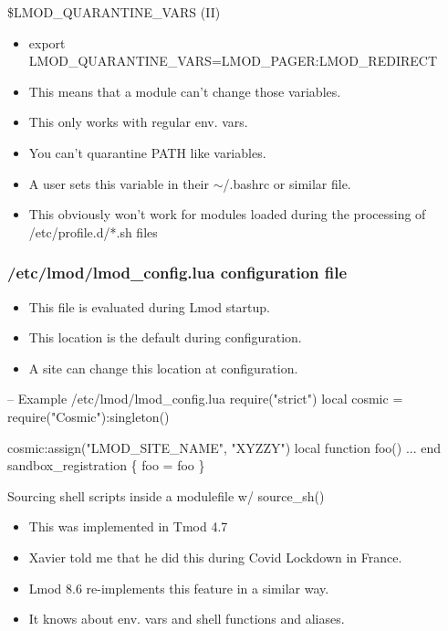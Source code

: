 \documentclass{beamer}
\begin{document}
\begin{frame}{\$LMOD\_QUARANTINE\_VARS (II)}
  \begin{itemize}
    \item export LMOD\_QUARANTINE\_VARS=LMOD\_PAGER:LMOD\_REDIRECT
    \item This means that a module can't change those variables.
    \item This only works with regular env. vars.
    \item You can't quarantine PATH like variables.
    \item A user sets this variable in their $\sim$/.bashrc or similar
      file.
    \item This obviously won't work for modules loaded during the
      processing of /etc/profile.d/*.sh files
  \end{itemize}
\end{frame}

\begin{frame}[fragile]
  \frametitle{/etc/lmod/lmod\_config.lua configuration file}
  \begin{itemize}
    \item This file is evaluated during Lmod startup. 
    \item This location is the default during configuration.
    \item A site can change this location at configuration.
  \end{itemize}
    {\small
\begin{semiverbatim}
-- Example /etc/lmod/lmod\_config.lua
require("strict")
local cosmic = require("Cosmic"):singleton()

cosmic:assign("LMOD\_SITE\_NAME", "XYZZY")
local function foo()
  ...
end
sandbox\_registration \{ foo = foo \}
\end{semiverbatim}
}
\end{frame}

\begin{frame}{Sourcing shell scripts inside a modulefile w/ source\_sh()}
  \begin{itemize}
    \item This was implemented in Tmod 4.7
    \item Xavier told me that he did this during Covid Lockdown in France.
    \item Lmod 8.6 re-implements this feature in a similar way.
    \item It knows about env. vars and shell functions and aliases.
  \end{itemize}
\end{frame}
\end{document}
